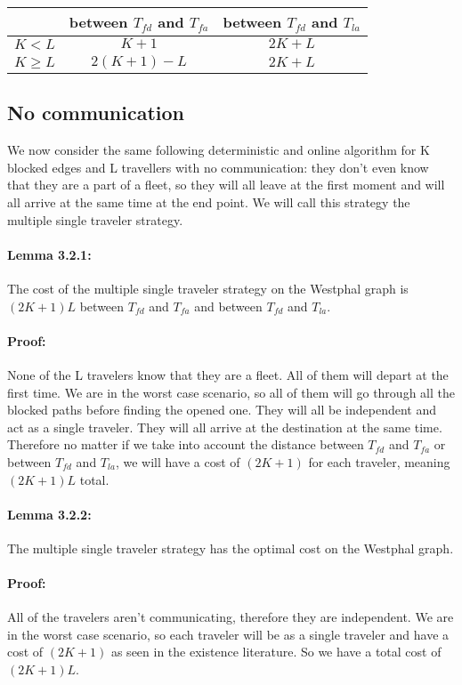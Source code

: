 \documentclass[a4paper, 10pt]{article}
\begin{document}
\begin{center}
\begin{tabular}{|c|c|c|}
\hline
 & between $T_{fd}$ and $T_{fa}$  & between $T_{fd}$ and $ T_{la}$ \\ 
\hline
 ${K<L}$  & ${K + 1}$ & ${ 2K + L}$   \\ 
\hline
 ${K \geq L}$  & ${2(K+1) - L}$ & ${2K + L}$   \\ 
\hline
\end{tabular}
\end{center}

\subsection{No communication}
We now consider the same following deterministic and online algorithm for K blocked edges and L travellers with no communication: they don't even know that they are a part of a fleet, so they will all leave at the first moment and will all arrive at the same time at the end point. We will call this strategy the multiple single traveler strategy.

\paragraph{Lemma 3.2.1:} The cost of the multiple single traveler strategy on the Westphal graph is $(2K+1)L$ between $T_{fd}$ and $T_{fa}$ and between $T_{fd}$ and $T_{la}$.

\paragraph{Proof:} None of the L travelers know that they are a fleet. All of them will depart at the first time. We are in the worst case scenario, so all of them will go through all the blocked paths before finding the opened one. They will all be independent and act as a single traveler. They will all arrive at the destination at the same time. Therefore no matter if we take into account the distance between $T_{fd}$ and $T_{fa}$ or between $T_{fd}$ and $T_{la}$, we will have a cost of $(2K+1)$ for each traveler, meaning $(2K+1)L$ total.

\paragraph{Lemma 3.2.2:} The multiple single traveler strategy has the optimal cost on the Westphal graph.

\paragraph{Proof:} All of the travelers aren't communicating, therefore they are independent. We are in the worst case scenario, so each traveler will be as a single traveler and have a cost of $(2K+1)$ as seen in the existence literature. So we have a total cost of $(2K+1)L$.
\end{document}
